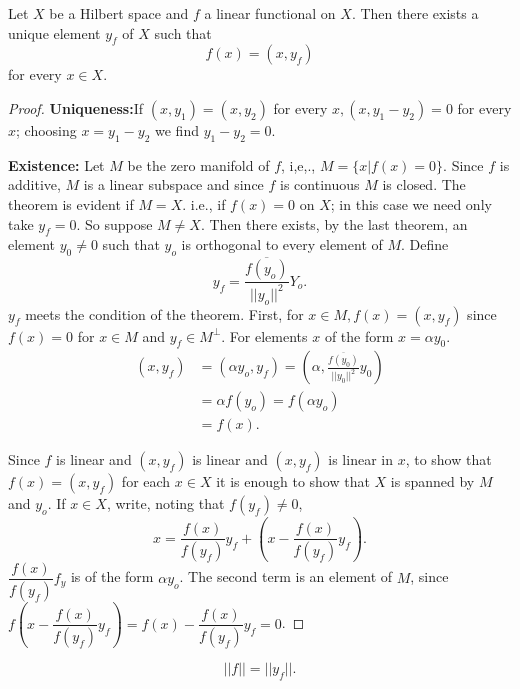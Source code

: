 \begin{theorem*}[Riesz]
 Let $X$ be a Hilbert space and $f$ a linear functional on $X$. Then
 there exists a unique element $y_f$ of $X$ such that 
 $$
 f(x) = (x, y_f )
 $$
 for every $x \in X$.
\end{theorem*}

\begin{proof}
 \textbf{ Uniqueness:}\pageoriginale If $(x, y_1) = (x, y_2)$ for every $x, (x,
 y_1- y_2) = 0$ for every $x$; choosing $x=y_1-y_2$ we find
 $y_1-y_2=0$. 
 
 \textbf{Existence:}
 Let $M$ be the zero manifold of $f$, i,e,., $M = \{x | f(x) =
 0\}$. Since $f$ is additive, $M$ is a linear subspace and since $f$
 is continuous $M$ is closed. The theorem is evident if $M =
 X$. i.e., if $f(x) = 0 $ on $X$; in this case we need only take $y_f
 = 0$. So suppose $M \neq X$. Then there exists, by the last theorem,
 an element $y_0 \neq 0$ such that $y_o$ is orthogonal to every
 element of $M$. Define 
 $$
 y_f = \frac{\overline{ f (y_o)}}{|| y_o ||^2} Y_o. 
 $$
 $y_f$ meets the condition of the theorem. First, for $x \in
 M, f(x) = (x, y_f)$ since $f(x) = 0 $ for $x \in M$ and
 $y_f \in M^\perp$. For elements $x$ of the form $x = \alpha y_0$. 
 \begin{align*}
  (x, y_f ) & = (\alpha y_o, y_f) = \left(\alpha, \frac{\overline{
    f(y_0)}}{||y_0||^2} y_0\right)\\ 
  & = \alpha f(y_o) = f(\alpha y_o)\\
  & = f(x). 
 \end{align*}
 
 Since $f$ is linear and $(x, y_f)$ is linear and $(x, y_f)$ is
 linear in $x$, to show that $f(x) = (x, y_f)$ for each $x
 \in X $ it is enough to show that $X$ is spanned by $M$
 and $y_o$. If $x \in X$, write, noting that $f(y_f) \neq 0$, 
 $$
 x = \frac{f(x)}{f(y_f)} y_f + \left( x - \frac{f(x)}{f(y_f)} y_f \right). 
 $$
 $\dfrac{f(x)}{f(y_f)} f_y$ is of the form $\alpha y_o$. The second
 term is an element of $M$, since $ 
 f\left(x - \dfrac{f(x)}{f(y_f)} y_f\right) =  f(x) -
 \dfrac{f(x)}{f(y_f)} y_f = 0 $. 
\end{proof} 

\begin{remark*}
 $$
 || f || = || y_f ||. 
 $$
\end{remark*} 
